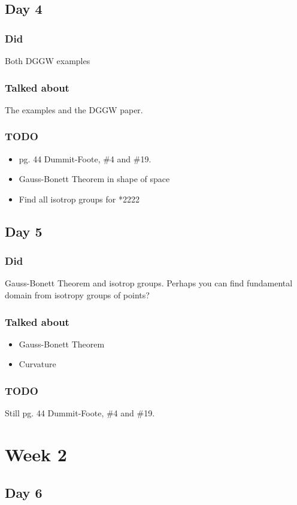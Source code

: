 \documentclass[11pt]{article}
\begin{document}
\subsection{Day 4}
\subsubsection{Did}
Both DGGW examples
\subsubsection{Talked about}
The examples and the DGGW paper.
\subsubsection{TODO}
\begin{itemize}
    \item pg. 44 Dummit-Foote, \#4 and \#19.
    \item Gauss-Bonett Theorem in shape of space
    \item Find all isotrop groups for *2222
\end{itemize}
\subsection{Day 5}
\subsubsection{Did}
Gauss-Bonett Theorem and isotrop groups. Perhaps you can find fundamental domain from isotropy groups of points?
\subsubsection{Talked about}
\begin{itemize}
    \item Gauss-Bonett Theorem
    \item Curvature
\end{itemize}
\subsubsection{TODO}
Still pg. 44 Dummit-Foote, \#4 and \#19.
\section{Week 2}
\subsection{Day 6}
\end{document}
